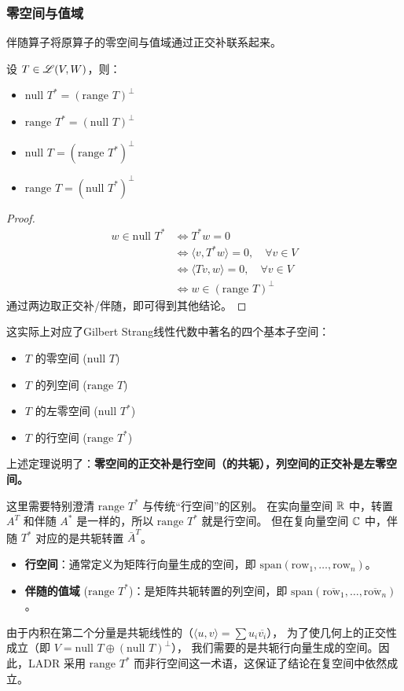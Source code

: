 \subsubsection{零空间与值域}
伴随算子将原算子的零空间与值域通过正交补联系起来。
\begin{theorem}[伴随的零空间与值域]
    设 \(T \in \mathscr{L}(V, W)\)，则：
    \begin{itemize}
        \item \(\text{null } T^* = (\text{range } T)^\perp\)
        \item \(\text{range } T^* = (\text{null } T)^\perp\)
        \item \(\text{null } T = (\text{range } T^*)^\perp\)
        \item \(\text{range } T = (\text{null } T^*)^\perp\)
    \end{itemize}
\end{theorem}

\begin{proof}
    \begin{align*}
        w \in \text{null } T^* &\iff T^*w = 0 \\
        &\iff \langle v, T^*w \rangle = 0, \quad \forall v \in V \\
        &\iff \langle Tv, w \rangle = 0, \quad \forall v \in V \\
        &\iff w \in (\text{range } T)^\perp
    \end{align*}
    通过两边取正交补/伴随，即可得到其他结论。
\end{proof}

这实际上对应了Gilbert Strang线性代数中著名的四个基本子空间：
\begin{itemize}
    \item \(T\) 的零空间 (\(\text{null } T\))
    \item \(T\) 的列空间 (\(\text{range } T\))
    \item \(T\) 的左零空间 (\(\text{null } T^*\))
    \item \(T\) 的行空间 (\(\text{range } T^*\))
\end{itemize}

上述定理说明了：\textbf{零空间的正交补是行空间（的共轭），列空间的正交补是左零空间。}

这里需要特别澄清 \(\text{range } T^*\) 与传统``行空间''的区别。
在实向量空间 \(\mathbb{R}\) 中，转置 \(A^T\) 和伴随 \(A^*\) 是一样的，所以 \(\text{range } T^*\) 就是行空间。
但在复向量空间 \(\mathbb{C}\) 中，伴随 \(T^*\) 对应的是共轭转置 \(\bar{A}^T\)。
\begin{itemize}
    \item \textbf{行空间}：通常定义为矩阵行向量生成的空间，即 \(\text{span}(\text{row}_1,
        \dots, \text{row}_n)\)。
    \item \textbf{伴随的值域} (\(\text{range } T^*\))：是矩阵共轭转置的列空间，即
        \(\text{span}(\overline{\text{row}_1}, \dots,
        \overline{\text{row}_n})\)。
\end{itemize}
由于内积在第二个分量是共轭线性的（\(\langle u, v \rangle = \sum u_i \overline{v_i}\)），
为了使几何上的正交性成立（即 \(V = \text{null } T \oplus (\text{null } T)^\perp\)），
我们需要的是共轭行向量生成的空间。因此，LADR 采用 \(\text{range } T^*\) 而非行空间这一术语，这保证了结论在复空间中依然成立。

